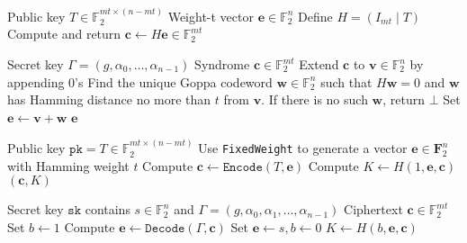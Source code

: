 \documentclass[runningheads]{llncs}
\newcommand{\pk}{\texttt{pk}}
\newcommand{\sk}{\texttt{sk}}
\newcommand{\wt}{\mathop{wt}}
\begin{document}
\begin{algorithm}
    \caption{$\texttt{Encode}(T, \mathbf{e})$}\label{alg:mceliece-encode}
    \begin{algorithmic}[1]
        \Require Public key $T\in\mathbb{F}_2^{mt \times (n - mt)}$
        \Require Weight-t vector $\mathbf{e}\in\mathbb{F}_2^n$
        \State Define $H = (I_{mt} \mid T)$
        \State Compute and return $\mathbf{c} \leftarrow H\mathbf{e} \in \mathbb{F}_2^{mt}$
    \end{algorithmic}
\end{algorithm}

\begin{algorithm}
    \caption{$\texttt{Decode}(\Gamma, \mathbf{c})$}\label{alg:mceliece-decode}
    \begin{algorithmic}[1]
        \Require Secret key $\Gamma = (g, \alpha_0, \ldots, \alpha_{n-1})$
        \Require Syndrome $\mathbf{c}\in\mathbb{F}_2^{mt}$
        \State Extend $\mathbf{c}$ to $\mathbf{v} \in\mathbb{F}_2^n$ by appending 0's 
        \State Find the unique Goppa codeword $\mathbf{w}\in\mathbb{F}_2^n$ such that $H\mathbf{w} = 0$ and $\mathbf{w}$ has Hamming distance no more than $t$ from $\mathbf{v}$. If there is no such $\mathbf{w}$, return $\bot$
        \State Set $\mathbf{e} \leftarrow \mathbf{v} + \mathbf{w}$
        \State \Return $\mathbf{e}$
    \end{algorithmic}
\end{algorithm}

\begin{algorithm}
    \caption{$\texttt{Encap}(\pk)$}\label{alg:mceliece-encap}
    \begin{algorithmic}[1]
        \Require Public key $\pk = T\in\mathbb{F}_2^{mt \times (n - mt)}$
        \State Use \texttt{FixedWeight} to generate a vector $\mathbf{e} \in \mathbf{F}_2^n$ with Hamming weight $t$
        \State Compute $\mathbf{c} \leftarrow \texttt{Encode}(T, \mathbf{e})$
        \State Compute $K \leftarrow H(1, \mathbf{e}, \mathbf{c})$
        \State \Return $(\mathbf{c}, K)$
    \end{algorithmic}
\end{algorithm}

\begin{algorithm}
    \caption{$\texttt{Decap}(\sk, \mathbf{c})$}\label{alg:mceliece-decap}
    \begin{algorithmic}[1]
        \Require Secret key $\sk$ contains $s \in \mathbb{F}_2^n$ and $\Gamma = (g, \alpha_0, \alpha_1, \ldots, \alpha_{n-1})$
        \Require Ciphertext $\mathbf{c} \in \mathbb{F}_2^{mt}$
        \State Set $b \leftarrow 1$
        \State Compute $\mathbf{e} \leftarrow \texttt{Decode}(\Gamma, \mathbf{c})$
        \If{$\wt(\mathbf{e})\neq t \lor H\mathbf{e}\neq\mathbf{c}$}
            \State Set $\mathbf{e} \leftarrow s, b \leftarrow 0$
        \EndIf
        \State \Return $K \leftarrow H(b, \mathbf{e}, \mathbf{c})$
    \end{algorithmic}
\end{algorithm}
\end{document}
